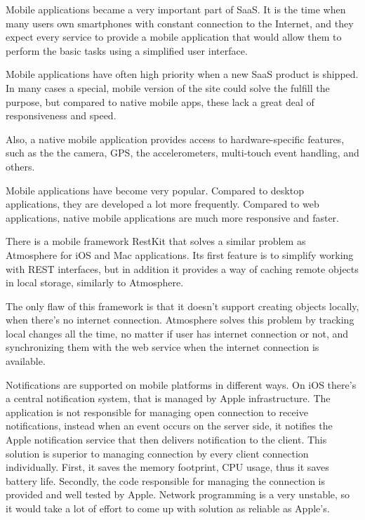 Mobile applications became a very important part of SaaS. It is the time when many users own smartphones with constant connection to the Internet, and they expect every service to provide a mobile application that would allow them to perform the basic tasks using a simplified user interface. \citep{facebook_stats}

Mobile applications have often high priority when a new SaaS product is shipped. In many cases a special, mobile version of the site could solve the fulfill the purpose, but compared to native mobile apps, these lack a great deal of responsiveness and speed.

Also, a native mobile application provides access to hardware-specific features, such as the the camera, GPS, the accelerometers, multi-touch event handling, and others.

Mobile applications have become very popular. \citep{facebook_stats} Compared to desktop applications, they are developed a lot more frequently. Compared to web applications, native mobile applications are much more responsive and faster.

There is a mobile framework RestKit \citep{restkit} that solves a similar problem as Atmosphere for iOS and Mac applications. Its first feature is to simplify working with REST interfaces, but in addition it provides a way of caching remote objects in local storage, similarly to Atmosphere.

The only flaw of this framework is that it doesn’t support creating objects locally, when there’s no internet connection. Atmosphere solves this problem by tracking local changes all the time, no matter if user has internet connection or not, and synchronizing them with the web service when the internet connection is available.

Notifications are supported on mobile platforms in different ways. On iOS there’s a central notification system, that is managed by Apple infrastructure. \citep{iphone_ipad_book} The application is not responsible for managing open connection to receive notifications, instead when an event occurs on the server side, it notifies the Apple notification service that then delivers notification to the client. This solution is superior to managing connection by every client connection individually. First, it saves the memory footprint, CPU usage, thus it saves battery life. Secondly, the code responsible for managing the connection is provided and well tested by Apple. Network programming is a very unstable, so it would take a lot of effort to come up with solution as reliable as Apple’s. 

